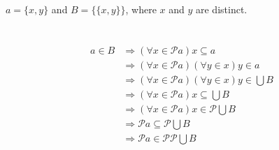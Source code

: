 \section{}
$ a = \{x, y\} $ and $ B = \{\{x, y\}\} $, where $x$ and $y$ are distinct.


\section{}
\[ \begin{array}{rl}
  a \in B
  & \Rightarrow (\forall x \in \mathscr{P}a) x \subseteq a \\
  & \Rightarrow (\forall x \in \mathscr{P}a)(\forall y \in x) y \in a \\
  & \Rightarrow (\forall x \in \mathscr{P}a)(\forall y \in x) y \in \bigcup B \\
  & \Rightarrow (\forall x \in \mathscr{P}a) x \subseteq \bigcup B \\
  & \Rightarrow (\forall x \in \mathscr{P}a) x \in \mathscr{P}\bigcup B \\
  & \Rightarrow \mathscr{P}a \subseteq \mathscr{P}\bigcup B \\
  & \Rightarrow \mathscr{P}a \in \mathscr{PP}\bigcup B \\
\end{array}\]